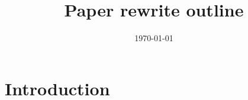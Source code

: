 \documentclass[aps,prd,reprint,groupedaddress]{revtex4-2}
\begin{document}

\title{Paper rewrite outline}


\author{}
\affiliation{}


\date{\today}

\begin{abstract}
\end{abstract}


\maketitle

\section{Introduction}
\label{sec:rewrite-introduction}
\end{document}
